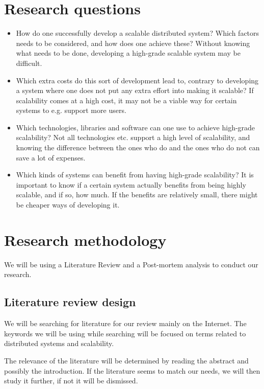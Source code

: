 \documentclass{article}
\begin{document}
\section{Research questions}
\begin{itemize}
\item{How do one successfully develop a scalable distributed system? Which
factors needs to be considered, and how does one achieve these? Without knowing
what needs to be done, developing a high-grade scalable system may be
difficult.} 

\item{Which extra costs do this sort of development lead to, contrary to
developing a system where one does not put any extra effort into making it
scalable? If scalability comes at a high cost, it may not be a viable way for
certain systems to e.g. support more users.} 

\item{Which technologies, libraries and software can one use to achieve
high-grade scalability? Not all technologies etc. support a high level of
scalability, and knowing the difference between the ones who do and the ones
who do not can save a lot of expenses.} 

\item{Which kinds of systems can benefit from having high-grade scalability? It
is important to know if a certain system actually benefits from being highly
scalable, and if so, how much. If the benefits are relatively small, there 
might be cheaper ways of developing it.}
\end{itemize}

\section{Research methodology}
We will be using a Literature Review and a Post-mortem analysis to conduct our 
research. 

\subsection{Literature review design}
We will be searching for literature for our review mainly on the Internet. The
keywords we will be using while searching will be focused on terms related to
distributed systems and scalability. 

The relevance of the literature will be determined by reading the abstract and
possibly the introduction. If the literature seems to match our needs, we will
then study it further, if not it will be dismissed.
\end{document}
